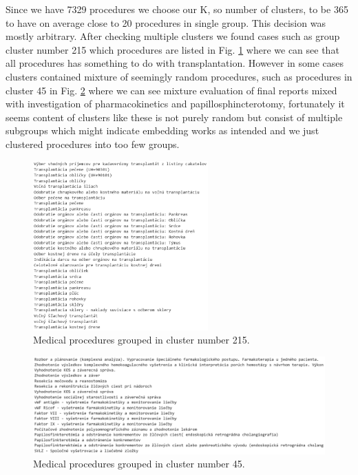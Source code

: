 Since we have 7329 procedures we choose our K, so number of clusters, to be 365 to have on average close to 20 procedures in single group. This decision was mostly arbitrary. After checking multiple clusters we found cases such as group cluster number 215 which procedures are listed in Fig. \ref{fig:G215} where we can see that all procedures has something to do with transplantation. However in some cases clusters contained mixture of seemingly random procedures, such as procedures in cluster 45 in Fig. \ref{fig:G45} where we can see mixture evaluation of final reports mixed with investigation of pharmacokinetics and papillosphincterotomy, fortunately it seems content of clusters like these is not purely random but consist of multiple subgroups which might indicate embedding works as intended and we just clustered procedures into too few groups.


\begin{figure}[!h]
	\centering
	
	\includegraphics[width=0.6\textwidth]{images/G215.png}
	
	\caption{Medical procedures grouped in cluster number 215.}
	\label{fig:G215}
\end{figure}

\begin{figure}[!h]
	\centering
	
	\includegraphics[width=1.1\textwidth]{images/G45.png}
	
	\caption{Medical procedures grouped in cluster number 45.}
	\label{fig:G45}
\end{figure}